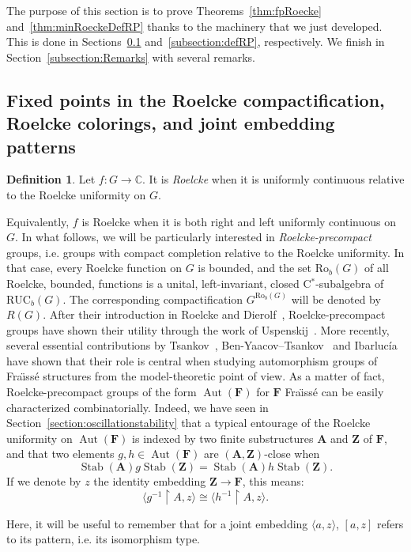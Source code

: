 \documentclass[11pt]{article}
\theoremstyle{definition}
\newtheorem{defi}[theo]{Definition}
\numberwithin{equation}{section}
\numberwithin{figure}{section}
\numberwithin{table}{section}
\newcommand{\CC}{\mathbb{C}}
\newcommand*{\mA}{\mathbf{A}}
\newcommand*{\mF}{\mathbf{F}}
\newcommand*{\mZ}{\mathbf{Z}}
\newcommand{\restrict}[2]{#1 \upharpoonright #2}
\DeclareMathOperator{\Aut}{Aut}
\DeclareMathOperator{\Stab}{Stab}
\newcommand{\RUCB}{\mathrm{RUC}_{b}}
\newcommand{\ROB}{\mathrm{Ro}_{b}}
\begin{document}
The purpose of this section is to prove Theorems~\ref{thm:fpRoecke} and~\ref{thm:minRoeckeDefRP} thanks to the machinery that we just developed. This is done in Sections~\ref{subsection:Roelcke} and~\ref{subsection:defRP}, respectively. We finish in Section~\ref{subsection:Remarks} with several remarks.

\subsection{Fixed points in the Roelcke compactification, Roelcke colorings, and joint embedding patterns}
\label{subsection:Roelcke}

\begin{defi}
Let $f : G \rightarrow \CC$. It is \emph{Roelcke} when it is uniformly continuous relative to the Roelcke uniformity on $G$.
\end{defi}

Equivalently, $f$ is Roelcke when it is both right and left uniformly continuous on~$G$. In what follows, we will be particularly interested in \emph{Roelcke-precompact} groups, i.e. groups with compact completion relative to the Roelcke uniformity. In that case, every Roelcke function on $G$ is bounded, and the set $\ROB(G)$ of all Roelcke, bounded, functions is a unital, left-invariant, closed C$^{*}$-subalgebra of $\RUCB(G)$. The corresponding compactification $G^{\ROB(G)}$ will be denoted by $R(G)$. After their introduction in Roelcke and Dierolf~\cite{RD}, Roelcke-precompact groups have shown their utility through the work of Uspenskij~\cite{Us3, Us4, Us5}. More recently, several essential contributions by Tsankov~\cite{Ts}, Ben-Yaacov--Tsankov~\cite{BYT} and Ibarluc\'ia~\cite{I0, I1} have shown that their role is central when studying automorphism groups of Fra\"{\i}ss\'e structures from the model-theoretic point of view. As a matter of fact, Roelcke-precompact groups of the form $\Aut(\mF)$ for $\mF$ Fra\"{\i}ss\'e can be easily characterized combinatorially. Indeed, we have seen in Section~\ref{section:oscillationstability} that a typical entourage of the Roelcke uniformity on $\Aut(\mF)$ is indexed by two finite substructures $\mA$ and $\mZ$ of $\mF$, and that two elements $g,h\in \Aut(\mF)$ are $(\mA, \mZ)$-close when
\[
\Stab(\mA)g\Stab(\mZ)=\Stab(\mA)h\Stab(\mZ).
\]
If we denote by $z$ the identity embedding $\mZ\to \mF$, this means:
\[
\langle \restrict{g^{-1}}{A}, z \rangle\cong \langle \restrict{h^{-1}}{A}, z \rangle.
\]

Here, it will be useful to remember that for a joint embedding $\langle a,z\rangle$, $[a,z]$ refers to its pattern, i.e. its isomorphism type.
\end{document}
